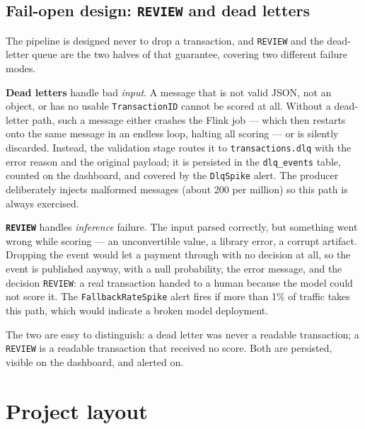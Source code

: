 \documentclass[11pt,a4paper]{article}
\newcommand{\code}[1]{\texttt{#1}}
\begin{document}
\subsection{Fail-open design: \code{REVIEW} and dead letters}

The pipeline is designed never to drop a transaction, and \code{REVIEW} and
the dead-letter queue are the two halves of that guarantee, covering two
different failure modes.

\textbf{Dead letters} handle bad \emph{input}. A message that is not valid
JSON, not an object, or has no usable \code{TransactionID} cannot be scored at
all. Without a dead-letter path, such a message either crashes the Flink job
--- which then restarts onto the same message in an endless loop, halting all
scoring --- or is silently discarded. Instead, the validation stage routes it
to \code{transactions.dlq} with the error reason and the original payload; it
is persisted in the \code{dlq\_events} table, counted on the dashboard, and
covered by the \code{DlqSpike} alert. The producer deliberately injects
malformed messages (about 200 per million) so this path is always exercised.

\textbf{\code{REVIEW}} handles \emph{inference} failure. The input parsed
correctly, but something went wrong while scoring --- an unconvertible value,
a library error, a corrupt artifact. Dropping the event would let a payment
through with no decision at all, so the event is published anyway, with a
null probability, the error message, and the decision \code{REVIEW}: a real
transaction handed to a human because the model could not score it. The
\code{FallbackRateSpike} alert fires if more than 1\% of traffic takes this
path, which would indicate a broken model deployment.

The two are easy to distinguish: a dead letter was never a readable
transaction; a \code{REVIEW} is a readable transaction that received no
score. Both are persisted, visible on the dashboard, and alerted on.

\clearpage

\section{Project layout}
\end{document}
